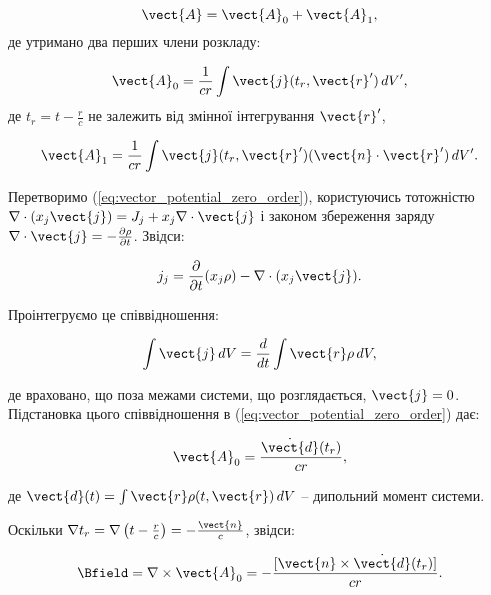 \begin{equation}
	\vect{A} = \vect{A}_0 + \vect{A}_1,
	\label{eq:vector_potential_expansion}
\end{equation}
де утримано два перших члени розкладу:

\begin{equation}
	\vect{A}_0 = \frac{1}{c r} \int \vect{j}(t_r, \vect{r}') \, dV',
	\label{eq:vector_potential_zero_order}
\end{equation}
де \( t_r = t - \frac{r}{c} \) не залежить від змінної інтегрування \( \vect{r}' \),

\begin{equation}\label{eq:A1}
	\vect{A}_1 = \frac{1}{c r} \int \vect{j}(t_r, \vect{r}')(\vect{n} \cdot \vect{r}') \, dV'.
\end{equation}

Перетворимо (\ref{eq:vector_potential_zero_order}), користуючись тотожністю \( \nabla \cdot (x_j \vect{j}) = J_j + x_j \nabla \cdot \vect{j} \) і
законом збереження заряду \( \nabla \cdot \vect{j} = -\frac{\partial \rho}{\partial t} \). Звідси:

\begin{equation*}
	j_j = \frac{\partial}{\partial t}(x_j \rho) - \nabla \cdot (x_j \vect{j}).
\end{equation*}

Проінтегруємо це співвідношення:

\begin{equation*}
	\int \vect{j} \, dV = \frac{d}{dt} \int \vect{r} \rho \, dV,
\end{equation*}

де враховано, що поза межами системи, що розглядається, \( \vect{j} = 0 \). Підстановка цього співвідношення в (\ref{eq:vector_potential_zero_order})
дає:

\begin{equation}
	\vect{A}_0 = \frac{\dot{\vect{d}}(t_r)}{c r},
	\label{eq:dipole_potential}
\end{equation}

де \( \vect{d}(t) = \int \vect{r} \rho(t, \vect{r}) \, dV \) – дипольний момент системи.

Оскільки \( \nabla t_r = \nabla \left(t - \frac{r}{c}\right) = -\frac{\vect{n}}{c} \), звідси:

\begin{equation*}
	\Bfield = \nabla \times \vect{A}_0 = -\frac{[\vect{n} \times \dot{\vect{d}}(t_r)]}{c r}.
\end{equation*}

